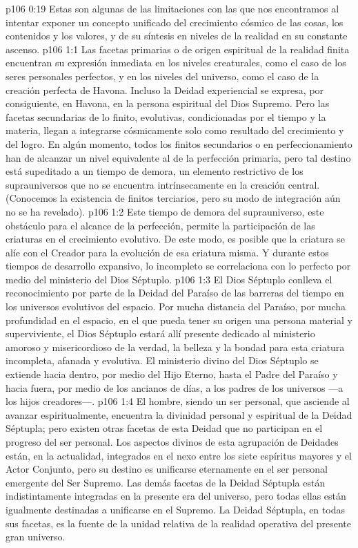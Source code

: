 \vs p106 0:19 \pc Estas son algunas de las limitaciones con las que nos encontramos al intentar exponer un concepto unificado del crecimiento cósmico de las cosas, los contenidos y los valores, y de su síntesis en niveles de la realidad en su constante ascenso.
\vs p106 1:1 Las facetas primarias o de origen espiritual de la realidad finita encuentran su expresión inmediata en los niveles creaturales, como el caso de los seres personales perfectos, y en los niveles del universo, como el caso de la creación perfecta de Havona. Incluso la Deidad experiencial se expresa, por consiguiente, en Havona, en la persona espiritual del Dios Supremo. Pero las facetas secundarias de lo finito, evolutivas, condicionadas por el tiempo y la materia, llegan a integrarse cósmicamente solo como resultado del crecimiento y del logro. En algún momento, todos los finitos secundarios o en perfeccionamiento han de alcanzar un nivel equivalente al de la perfección primaria, pero tal destino está supeditado a un tiempo de demora, un elemento restrictivo de los suprauniversos que no se encuentra intrínsecamente en la creación central. (Conocemos la existencia de finitos terciarios, pero su modo de integración aún no se ha revelado).
\vs p106 1:2 Este tiempo de demora del suprauniverso, este obstáculo para el alcance de la perfección, permite la participación de las criaturas en el crecimiento evolutivo. De este modo, es posible que la criatura se alíe con el Creador para la evolución de esa criatura misma. Y durante estos tiempos de desarrollo expansivo, lo incompleto se correlaciona con lo perfecto por medio del ministerio del Dios Séptuplo.
\vs p106 1:3 El Dios Séptuplo conlleva el reconocimiento por parte de la Deidad del Paraíso de las barreras del tiempo en los universos evolutivos del espacio. Por mucha distancia del Paraíso, por mucha profundidad en el espacio, en el que pueda tener su origen una persona material y superviviente, el Dios Séptuplo estará allí presente dedicado al ministerio amoroso y misericordioso de la verdad, la belleza y la bondad para esta criatura incompleta, afanada y evolutiva. El ministerio divino del Dios Séptuplo se extiende hacia dentro, por medio del Hijo Eterno, hasta el Padre del Paraíso y hacia fuera, por medio de los ancianos de días, a los padres de los universos ---a los hijos creadores---.
\vs p106 1:4 El hombre, siendo un ser personal, que asciende al avanzar espiritualmente, encuentra la divinidad personal y espiritual de la Deidad Séptupla; pero existen otras facetas de esta Deidad que no participan en el progreso del ser personal. Los aspectos divinos de esta agrupación de Deidades están, en la actualidad, integrados en el nexo entre los siete espíritus mayores y el Actor Conjunto, pero su destino es unificarse eternamente en el ser personal emergente del Ser Supremo. Las demás facetas de la Deidad Séptupla están indistintamente integradas en la presente era del universo, pero todas ellas están igualmente destinadas a unificarse en el Supremo. La Deidad Séptupla, en todas sus facetas, es la fuente de la unidad relativa de la realidad operativa del presente gran universo.
